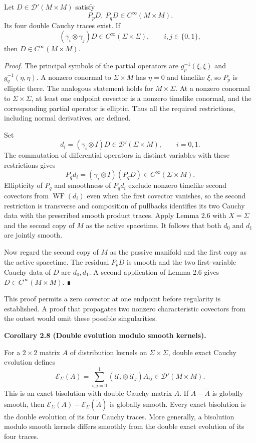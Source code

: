 \documentclass[
  english,
  11pt,
  reqno]{amsart}
\makeatletter
\newcommand{\pandocstatementheading}[1]{%
  \par\addpenalty{\@beginparpenalty}%
  \addvspace{.5\baselineskip plus .2\baselineskip minus .2\baselineskip}%
  {\normalfont\bfseries #1\par}%
  \nobreak\@afterindenttrue\@afterheading
}
\makeatother
\begin{document}
Let \(D\in\mathcal D'(M\times M)\) satisfy \[
P_pD,\ P_qD\in C^\infty(M\times M).
\] Its four double Cauchy traces exist. If \[
(\gamma_i\otimes\gamma_j)D
\in C^\infty(\Sigma\times\Sigma),
\qquad i,j\in\{0,1\},
\] then \(D\in C^\infty(M\times M)\).

\emph{Proof.} The principal symbols of the partial operators are
\(g_p^{-1}(\xi,\xi)\) and \(g_q^{-1}(\eta,\eta)\). A nonzero conormal to
\(\Sigma\times M\) has \(\eta=0\) and timelike \(\xi\), so \(P_p\) is
elliptic there. The analogous statement holds for \(M\times\Sigma\). At
a nonzero conormal to \(\Sigma\times\Sigma\), at least one endpoint
covector is a nonzero timelike conormal, and the corresponding partial
operator is elliptic. Thus all the required restrictions, including
normal derivatives, are defined.

Set \[
d_i=(\gamma_i\otimes I)D
\in\mathcal D'(\Sigma\times M),\qquad i=0,1.
\] The commutation of differential operators in distinct variables with
these restrictions gives \[
P_qd_i=(\gamma_i\otimes I)(P_qD)\in C^\infty(\Sigma\times M).
\] Ellipticity of \(P_q\) and smoothness of \(P_qd_i\) exclude nonzero
timelike second covectors from \(\operatorname{WF}(d_i)\) even when the
first covector vanishes, so the second restriction is transverse and
composition of pullbacks identifies its two Cauchy data with the
prescribed smooth product traces. Apply Lemma 2.6 with \(X=\Sigma\) and
the second copy of \(M\) as the active spacetime. It follows that both
\(d_0\) and \(d_1\) are jointly smooth.

Now regard the second copy of \(M\) as the passive manifold and the
first copy as the active spacetime. The residual \(P_pD\) is smooth and
the two first-variable Cauchy data of \(D\) are \(d_0,d_1\). A second
application of Lemma 2.6 gives \(D\in C^\infty(M\times M)\). ∎

This proof permits a zero covector at one endpoint before regularity is
established. A proof that propagates two nonzero characteristic
covectors from the outset would omit these possible singularities.

\pandocstatementheading{\protect{}\label{cor:double-evolution-quotient}Corollary 2.8 (Double evolution modulo smooth kernels).}

For a \(2\times2\) matrix \(A\) of distribution kernels on
\(\Sigma\times\Sigma\), double exact Cauchy evolution defines \[
\mathcal E_\Sigma(A)
=\sum_{i,j=0}^1
(\mathcal U_i\otimes\mathcal U_j)A_{ij}
\in\mathcal D'(M\times M).
\] This is an exact bisolution with double Cauchy matrix \(A\). If
\(A-\widetilde A\) is globally smooth, then
\(\mathcal E_\Sigma(A)-\mathcal E_\Sigma(\widetilde A)\) is globally
smooth. Every exact bisolution is the double evolution of its four
Cauchy traces. More generally, a bisolution modulo smooth kernels
differs smoothly from the double exact evolution of its four traces.
\end{document}
